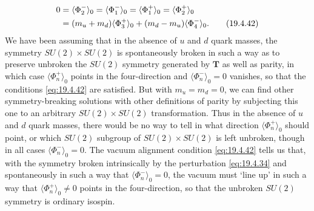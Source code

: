 \begin{align}
0
&=\langle\Phi_2^-\rangle_0
=\langle\Phi_1^-\rangle_0
=\langle\Phi_1^+\rangle_0
=\langle\Phi_2^+\rangle_0
\notag\\
&=(m_u+m_d)\langle\Phi_3^+\rangle_0
+(m_d-m_u)\langle\Phi_4^-\rangle_0.
\tag{19.4.42}\label{eq:19.4.42}
\end{align}
We have been assuming that in the absence of $u$ and $d$ quark masses, the symmetry $SU(2)\times SU(2)$ is spontaneously broken in such a way as to preserve unbroken the $SU(2)$ symmetry generated by $\mathbf{T}$ as well as parity, in which case $\langle\Phi_n^+\rangle_0$ points in the four-direction and $\langle\Phi_n^-\rangle_0=0$ vanishes, so that the conditions \eqref{eq:19.4.42} are satisfied. But with $m_u=m_d=0$, we can find other symmetry-breaking solutions with other definitions of parity by subjecting this one to an arbitrary $SU(2)\times SU(2)$ transformation. Thus in the absence of $u$ and $d$ quark masses, there would be no way to tell in what direction $\langle\Phi_n^+\rangle_0$ should point, or which $SU(2)$ subgroup of $SU(2)\times SU(2)$ is left unbroken, though in all cases $\langle\Phi_n^-\rangle_0=0$. The vacuum alignment condition \eqref{eq:19.4.42} tells us that, with the symmetry broken intrinsically by the perturbation \eqref{eq:19.4.34} and spontaneously in such a way that $\langle\Phi_n^-\rangle_0=0$, the vacuum must `line up' in such a way that $\langle\Phi_n^+\rangle_0\ne0$ points in the four-direction, so that the unbroken $SU(2)$ symmetry is ordinary isospin.

